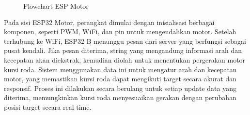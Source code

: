 \begin{figure}[H]
  \centering
  \resizebox{1\linewidth}{!}{
    
  }
  \caption{Flowchart ESP Motor}
\end{figure}

Pada sisi ESP32 Motor, perangkat dimulai dengan inisialisasi berbagai komponen, seperti PWM, WiFi, dan pin untuk mengendalikan motor. Setelah terhubung ke WiFi, ESP32 B menunggu pesan dari server yang berfungsi sebagai pusat kendali. Jika pesan diterima, string yang mengandung informasi arah dan kecepatan akan diekstrak, kemudian diolah untuk menentukan pergerakan motor kursi roda. Sistem menggunakan data ini untuk mengatur arah dan kecepatan motor, yang memastikan kursi roda dapat mengikuti target secara akurat dan responsif. Proses ini dilakukan secara berulang untuk setiap update data yang diterima, memungkinkan kursi roda menyesuaikan gerakan dengan perubahan posisi target secara real-time.
